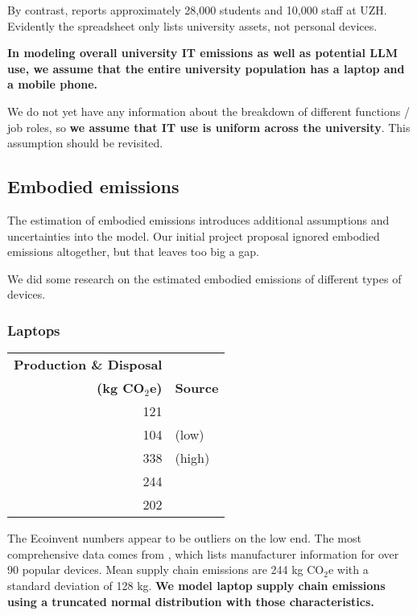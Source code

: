 \documentclass[11pt]{article}
\newcommand{\assumption}[1]{{\bf #1}}
\begin{document}
By contrast, \textcite{wikiuzh} reports approximately 28,000 students and 10,000 staff
at UZH. Evidently the spreadsheet only lists university assets, not personal devices.

\assumption{In modeling overall university IT emissions as well as potential LLM use,
we assume that the entire university population has a laptop and a mobile phone.}

We do not yet have any information about the breakdown of different functions / job roles, so
\assumption{we assume that IT use is uniform across the university}. This assumption should be
revisited.

\subsection{Embodied emissions}
The estimation of embodied emissions introduces additional assumptions and uncertainties into
the model. Our initial project proposal ignored embodied emissions altogether, but that leaves
too big a gap.

We did some research on the estimated embodied emissions of different types of devices.

\subsubsection{Laptops}

\begin{center}
\begin{tabular}{|r|l|}
\hline
\textbf{Production \& Disposal} & \\
\textbf{(kg CO$_2$e)} & \textbf{Source} \\ \hline
121 & \textcite{ecoinvent}  \\ \hline
104 & \textcite{teehan2013} (low) \\ \hline
338 & \textcite{teehan2013} (high) \\ \hline
244 & \textcite{rarecoil} \\ \hline
202 & \textcite{unctadder2024} \\ \hline
\end{tabular}
\label{tab:embodied_emissions:laptops}
\end{center}

The Ecoinvent numbers appear to be outliers on the low end.
The most comprehensive data comes from \textcite{rarecoil}, which lists manufacturer
information for over 90 popular devices. Mean supply chain emissions are
244 kg CO$_2$e with a standard deviation of 128 kg.
\assumption{We model laptop supply chain emissions using a truncated normal distribution with those characteristics.}
\end{document}
